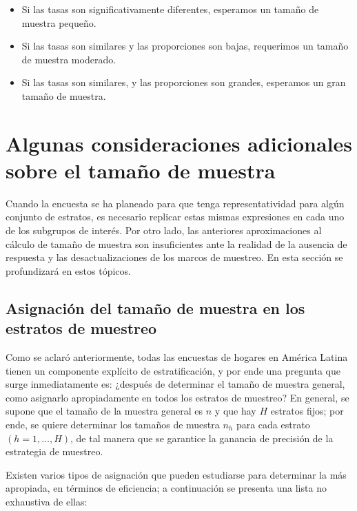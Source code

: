 \documentclass[
  12pt,
]{book}
\providecommand{\tightlist}{%
  \setlength{\itemsep}{0pt}\setlength{\parskip}{0pt}}
\begin{document}
\begin{itemize}
\tightlist
\item
  Si las tasas son significativamente diferentes, esperamos un tamaño de muestra pequeño.
\item
  Si las tasas son similares y las proporciones son bajas, requerimos un tamaño de muestra moderado.
\item
  Si las tasas son similares, y las proporciones son grandes, esperamos un gran tamaño de muestra.
\end{itemize}

\hypertarget{algunas-consideraciones-adicionales-sobre-el-tamauxf1o-de-muestra}{%
\section{Algunas consideraciones adicionales sobre el tamaño de muestra}\label{algunas-consideraciones-adicionales-sobre-el-tamauxf1o-de-muestra}}

Cuando la encuesta se ha planeado para que tenga representatividad para algún conjunto de estratos, es necesario replicar estas mismas expresiones en cada uno de los subgrupos de interés. Por otro lado, las anteriores aproximaciones al cálculo de tamaño de muestra son insuficientes ante la realidad de la ausencia de respuesta y las desactualizaciones de los marcos de muestreo. En esta sección se profundizará en estos tópicos.

\hypertarget{asignaciuxf3n-del-tamauxf1o-de-muestra-en-los-estratos-de-muestreo}{%
\subsection{Asignación del tamaño de muestra en los estratos de muestreo}\label{asignaciuxf3n-del-tamauxf1o-de-muestra-en-los-estratos-de-muestreo}}

Como se aclaró anteriormente, todas las encuestas de hogares en América Latina tienen un componente explícito de estratificación, y por ende una pregunta que surge inmediatamente es: ¿después de determinar el tamaño de muestra general, como asignarlo apropiadamente en todos los estratos de muestreo? En general, se supone que el tamaño de la muestra general es \(n\) y que hay \(H\) estratos fijos; por ende, se quiere determinar los tamaños de muestra \(n_h\) para cada estrato \((h = 1, \ldots, H)\), de tal manera que se garantice la ganancia de precisión de la estrategia de muestreo.

Existen varios tipos de asignación que pueden estudiarse para determinar la más apropiada, en términos de eficiencia; a continuación se presenta una lista no exhaustiva de ellas:
\end{document}
